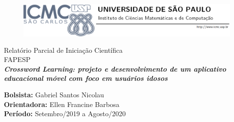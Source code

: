 \begin{titlepage}

\begin{center}
	\begin{figure}[!ht]
	\centering
	\includegraphics[scale=0.5]{Figuras/logo.png}
	\end{figure}
	\vspace{60pt}
	\begin{minipage}[c]{13.5cm}
			\begin{center}
			\vspace{1.3cm} {\Large\sf Relatório Parcial de Iniciação Científica}\\
			\vspace{0.3cm} {\Large\sf FAPESP}\\
			\vspace{5cm}
			\textbf{\Large\sf\textit{Crossword Learning: projeto e desenvolvimento de um
aplicativo educacional móvel com foco em usuários
idosos}}\\
			\vspace{1.3cm}
			\end{center}
		\end{minipage}
\vfill
\begin{minipage}[c]{13.5cm}
	\begin{center}
		\sffamily\textbf{Bolsista:} Gabriel Santos Nicolau\\
		\sffamily\textbf{Orientadora:} Ellen Francine Barbosa\\
		\sffamily\textbf{Período:} Setembro/2019 a Agosto/2020\\
	\end{center}
\end{minipage}
\end{center}
\cleardoublepage
\end{titlepage}